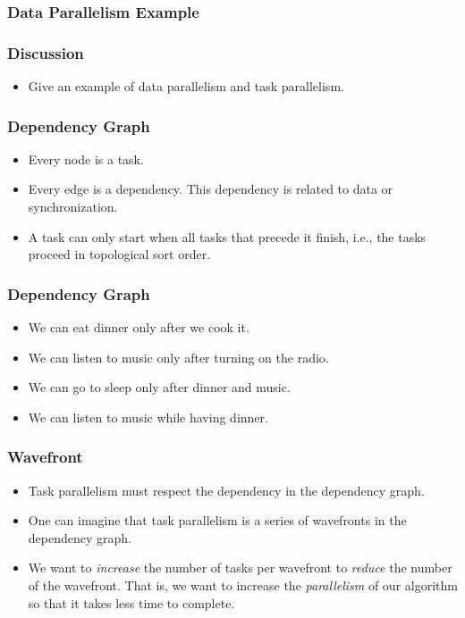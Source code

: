 \documentclass{beamer}
\begin{document}
\begin{CJK}{UTF8}{bsmi}
\begin{frame}
\frametitle{Data Parallelism Example}
\end{frame}


\begin{frame}
\frametitle{Discussion} 
\begin{itemize}
\item Give an example of data parallelism and task parallelism.
\end{itemize}
\end{frame}


\begin{frame}
\frametitle{Dependency Graph}
\begin{itemize}
\item Every node is a task.
\item Every edge is a dependency. This dependency is related to data or synchronization.
\item A task can only start when all tasks that precede it finish, i.e., the tasks proceed in topological sort order.
\end{itemize}
\end{frame}

\begin{frame}
\frametitle{Dependency Graph}
\begin{itemize}
\item We can eat dinner only after we cook it. 
\item We can listen to music only after turning on the radio.
\item We can go to sleep only after dinner and music.
\item We can listen to music while having dinner.
\end{itemize}
\end{frame}

\begin{frame}
\frametitle{Wavefront}
\begin{itemize}
\item Task parallelism must respect the dependency in the dependency graph.
\item One can imagine that task parallelism is a series of wavefronts in the dependency graph.  
\item We want to {\em increase} the number of tasks per wavefront to {\em reduce} the number of the wavefront. That is, we want to increase the {\em parallelism} of our algorithm so that it takes less time to complete.
\end{itemize}
\end{frame}


\end{CJK}
\end{document}
